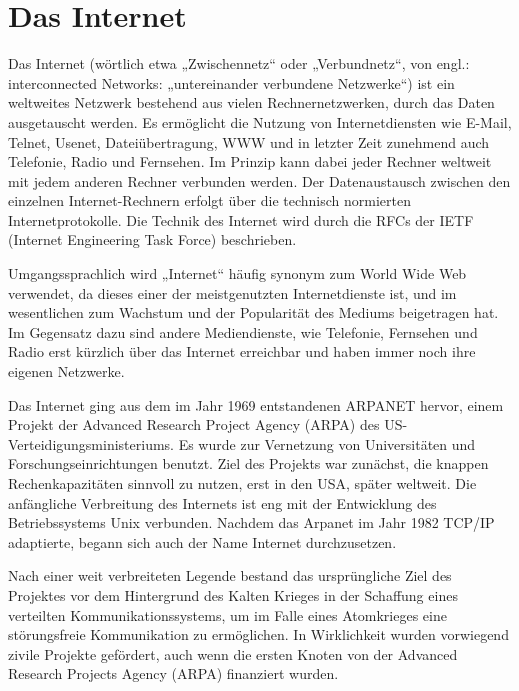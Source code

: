 \section{Das Internet}
Das Internet (wörtlich etwa „Zwischennetz“ oder „Verbundnetz“, von engl.: interconnected Networks: „untereinander verbundene Netzwerke“) ist ein weltweites Netzwerk bestehend aus vielen Rechnernetzwerken, durch das Daten ausgetauscht werden. Es ermöglicht die Nutzung von Internetdiensten wie E-Mail, Telnet, Usenet, Dateiübertragung, WWW und in letzter Zeit zunehmend auch Telefonie, Radio und Fernsehen. 
Im Prinzip kann dabei jeder Rechner weltweit mit jedem anderen Rechner verbunden werden. Der Datenaustausch zwischen den einzelnen Internet-Rechnern erfolgt über die technisch normierten Internetprotokolle. Die Technik des Internet wird durch die RFCs der IETF (Internet Engineering Task Force) beschrieben. 

Umgangssprachlich wird „Internet“ häufig synonym zum World Wide Web verwendet, da dieses einer der meistgenutzten Internetdienste ist, und im wesentlichen zum Wachstum und der Popularität des Mediums beigetragen hat. 
Im Gegensatz dazu sind andere Mediendienste, wie Telefonie, Fernsehen und Radio erst kürzlich über das Internet erreichbar und haben immer noch ihre eigenen Netzwerke.

Das Internet ging aus dem im Jahr 1969 entstandenen ARPANET hervor, einem Projekt der Advanced Research Project Agency (ARPA) des US-Verteidigungsministeriums. Es wurde zur Vernetzung von Universitäten und Forschungseinrichtungen benutzt. Ziel des Projekts war zunächst, die knappen Rechenkapazitäten sinnvoll zu nutzen, erst in den USA, später weltweit. 
Die anfängliche Verbreitung des Internets ist eng mit der Entwicklung des Betriebssystems Unix verbunden. Nachdem das Arpanet im Jahr 1982 TCP/IP adaptierte, begann sich auch der Name Internet durchzusetzen.

Nach einer weit verbreiteten Legende bestand das ursprüngliche Ziel des Projektes vor dem Hintergrund des Kalten Krieges in der Schaffung eines verteilten Kommunikationssystems, um im Falle eines Atomkrieges eine störungsfreie Kommunikation zu ermöglichen. In Wirklichkeit wurden vorwiegend zivile Projekte gefördert, auch wenn die ersten Knoten von der Advanced Research Projects Agency (ARPA) finanziert wurden.

